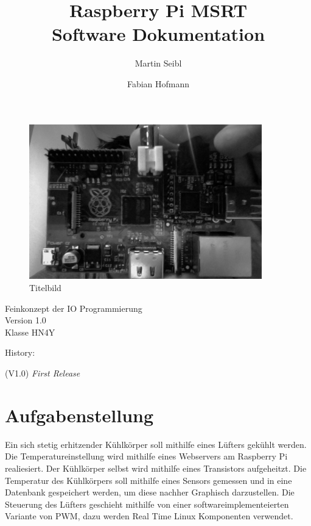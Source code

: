 \documentclass[12pt,a4paper]{article}
\author{Martin Seibl \and Fabian Hofmann}
\title{Raspberry Pi MSRT  \\ Software Dokumentation}
\newcommand{\version}{1.0 }
\begin{document}
\begin{titlepage}
\maketitle

\begin{figure}[htp]
\centering
\includegraphics[width=0.9\textwidth]{pics/logo.jpg} 
\caption{Titelbild}
\end{figure}

\begin{center}
\large{Feinkonzept der IO Programmierung}\\
\large{Version \version}\\
\large{Klasse HN4Y}\\
\end{center}

\large{History:} \par
(V1.0) \textit{First Release}

\end{titlepage}

\tableofcontents

\newpage
\section{Aufgabenstellung}
Ein sich stetig erhitzender Kühlkörper soll mithilfe eines Lüfters gekühlt werden.  Die Temperatureinstellung wird mithilfe eines Webservers am Raspberry Pi realiesiert. Der Kühlkörper selbst wird mithilfe eines Transistors aufgeheitzt. Die Temperatur des Kühlkörpers soll mithilfe eines Sensors gemessen und in eine Datenbank gespeichert werden, um diese nachher Graphisch darzustellen. 
Die Steuerung des Lüfters geschieht mithilfe von einer softwareimplementeierten Variante von PWM, dazu werden Real Time Linux Komponenten verwendet. 
\end{document}
